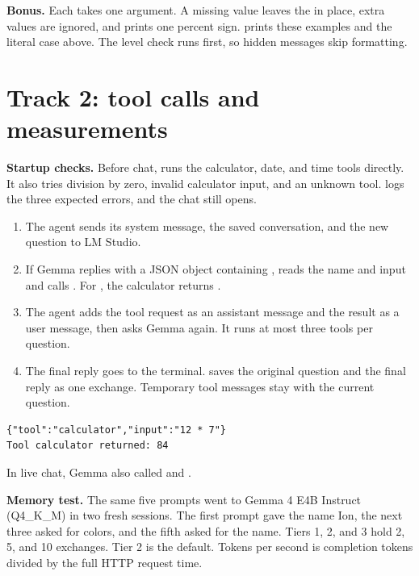 \textbf{Bonus.} Each \code{\%} takes one argument. A missing value leaves the \code{\%} in place, extra values are ignored, and \code{\%\%} prints one percent sign.  prints these examples and the literal  case above. The level check runs first, so hidden messages skip formatting.

\newpage
\section{Track 2: tool calls and measurements}
\textbf{Startup checks.} Before chat,  runs the calculator, date, and time tools directly. It also tries division by zero, invalid calculator input, and an unknown tool.  logs the three expected errors, and the chat still opens.

\begin{enumerate}
    \item The agent sends its system message, the saved conversation, and the new question to LM Studio.
    \item If Gemma replies with a JSON object containing ,  reads the name and input and calls . For , the calculator returns .
    \item The agent adds the tool request as an assistant message and the result as a user message, then asks Gemma again. It runs at most three tools per question.
    \item The final reply goes to the terminal.  saves the original question and the final reply as one exchange. Temporary tool messages stay with the current question.
\end{enumerate}

\begin{lstlisting}[language={}]
{"tool":"calculator","input":"12 * 7"}
Tool calculator returned: 84
\end{lstlisting}
In live chat, Gemma also called  and .

\textbf{Memory test.} The same five prompts went to Gemma 4 E4B Instruct (Q4\_K\_M) in two fresh sessions. The first prompt gave the name Ion, the next three asked for colors, and the fifth asked for the name. Tiers 1, 2, and 3 hold 2, 5, and 10 exchanges. Tier 2 is the default. Tokens per second is completion tokens divided by the full HTTP request time.


